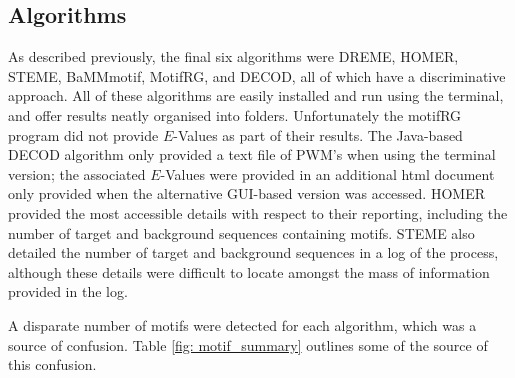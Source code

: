 \documentclass[12pt, onecolumn, oneside]{gsajnl}
\begin{document}
\subsection{Algorithms}

As described previously, the final six algorithms were DREME, HOMER, STEME, BaMMmotif, MotifRG, and DECOD, all of which have a discriminative approach. All of these algorithms are easily installed and run using the terminal, and offer results neatly organised into folders. Unfortunately the motifRG program did not provide $E$-Values as part of their results. The Java-based DECOD algorithm only provided a text file of PWM's when using the terminal version; the associated $E$-Values were provided in an additional html document only provided when the alternative GUI-based version was accessed. HOMER provided the most accessible details with respect to their reporting, including the number of target and background sequences containing motifs. STEME also detailed the number of target and background sequences in a log of the process, although these details were difficult to locate amongst the mass of information provided in the log.

A disparate number of motifs were detected for each algorithm, which was a source of confusion. Table \ref{fig: motif_summary} outlines some of the source of this confusion.
\end{document}
